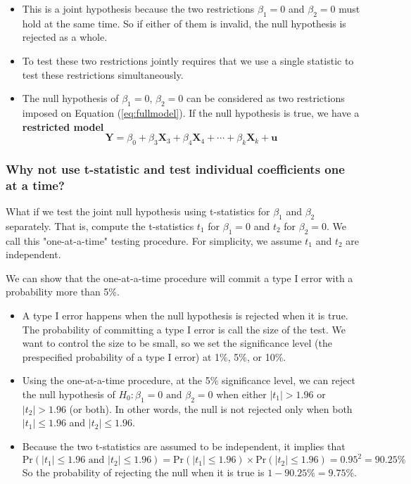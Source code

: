 \documentclass[a4paper,11pt]{article}
\newcommand{\pr}{\mathrm{Pr}}
\begin{document}
\begin{itemize}
\item This is a joint hypothesis because the two restrictions \(\beta_1=0\)
and \(\beta_2=0\) must hold at the same time. So if either of them is
invalid, the null hypothesis is rejected as a whole.

\item To test these two restrictions jointly requires that we use a
single statistic to test these restrictions simultaneously.

\item The null hypothesis of \(\beta_1 = 0,\, \beta_2 = 0\) can be
considered as two restrictions imposed on Equation
(\ref{eq:fullmodel}). If the null hypothesis is true, we have a
\textbf{restricted model}
\begin{equation}
\label{eq:restmodel-1}
\mathbf{Y} = \beta_0 + \beta_3 \mathbf{X}_3 + \beta_4 \mathbf{X}_4 + \cdots + \beta_k \mathbf{X}_k + \mathbf{u}
\end{equation}
\end{itemize}


\subsubsection*{Why not use t-statistic and test individual coefficients one at a time?}
\label{sec:org3b43edd}

What if we test the joint null hypothesis using t-statistics for
\(\beta_1\) and \(\beta_2\) separately. That is, compute the t-statistics
\(t_1\) for \(\beta_1 = 0\) and \(t_2\) for \(\beta_2 = 0\). We call this
"one-at-a-time" testing procedure. For simplicity, we assume \(t_1\) and
\(t_2\) are independent.

We can show that the one-at-a-time procedure will commit a type I
error with a probability more than 5\%.

\begin{itemize}
\item A type I error happens when the null hypothesis is rejected when it
is true. The probability of committing a type I error is call the
size of the test. We want to control the size to be small, so we set
the significance level (the prespecified probability of a type I
error) at 1\%, 5\%, or 10\%.

\item Using the one-at-a-time procedure, at the 5\% significance level, we
can reject the null hypothesis of \(H_0: \beta_1 = 0 \text{ and }
  \beta_2 = 0\) when either \(|t_1| > 1.96\) or \(|t_2| > 1.96\) (or
both). In other words, the null is not rejected only when both
\(|t_1| \leq 1.96\) and \(|t_2| \leq 1.96\).

\item Because the two t-statistics are assumed to be independent, it
implies that
\[\pr(|t_1| \leq 1.96 \text{ and } |t_2| \leq 1.96) = \pr(|t_1| \leq
  1.96) \times \pr(|t_2| \leq 1.96) = 0.95^2 = 90.25\%\]
So the probability of rejecting the null when it is true is \(1 -
  90.25\% = 9.75\%\).
\end{itemize}
\end{document}
